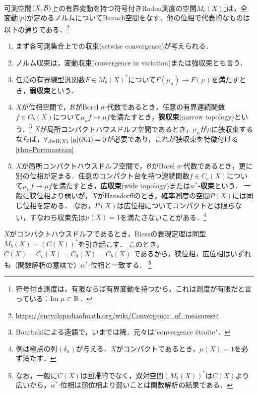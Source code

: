 \documentclass[uplatex,dvipdfmx]{jsreport}
\begin{document}
\begin{definition}
    可測空間$(X,\mathcal{B})$上の有界変動を持つ符号付きRadon測度の空間$M_b(X)$\footnote{符号付き測度は，有限ならば有界変動を持つから，これは測度が有限だと言っている：$\mathrm{Im}\;\mu\subset\mathbb{R}$．}は，全変動$\lvert\mu\rvert$が定めるノルムについてBanach空間をなす．他の位相で代表的なものは以下の通りである．\footnote{\url{https://encyclopediaofmath.org/wiki/Convergence_of_measures}}
    \begin{enumerate}
        \item まず各可測集合上での収束(setwise convergence)が考えられる．
        \item ノルム収束は，変動収束(convergence in variation)または強収束とも言う．
        \item 任意の有界線型汎関数$F\in M_b(X)^*$について$F(\mu_n)\to F(\mu)$を満たすとき，\textbf{弱収束}という．
        \item $X$が位相空間で，$\mathcal{B}$がBorel $\sigma$-代数であるとき，任意の有界連続関数$f\in C_b(X)$について$\mu_nf\to\mu f$を満たすとき，\textbf{狭収束}(narrow topology)という．\footnote{Bourbakiによる造語で，いまでは稀．元々は"convergence étroite"．}
        $X$が局所コンパクトハウスドルフ空間であるとき，$\mu_n$が$\mu$に狭収束するならば，$\forall_{A\in\mathcal{B}(X)}\;\lvert\mu\rvert(\partial A)=0$が必要であり，これが狭収束を特徴付ける\ref{thm-Portmanteau}
        \item $X$が局所コンパクトハウスドルフ空間で，$\mathcal{B}$がBorel $\sigma$-代数であるとき，更に別の位相が定まる．任意のコンパクト台を持つ連続関数$f\in C_c(X)$について$\mu_nf\to\mu f$を満たすとき，\textbf{広収束}(wide topology)または\textbf{$w^*$-収束}という．
        一般に狭位相より弱いが，$X$がHausdorffのとき，確率測度の空間$P(X)$には同じ位相を定める．
        なお，$P(X)$は広位相についてコンパクトとは限らない，すなわち収束先は$\mu(X)=1$を満たさないことがある．\footnote{例は極点の列$(\delta_n)$が与える．$X$がコンパクトであるとき，$\mu(X)=1$を必ず満たす．}
    \end{enumerate}
\end{definition}
\begin{remark}
\end{remark}

\begin{example}
    $X$がコンパクトハウスドルフであるとき，Rieszの表現定理は同型$M_b(X)=(C(X))^*$を引き起こす．
    このとき，$C(X)=C_c(X)=C_0(X)=C_b(X)$
    であるから，狭位相，広位相はいずれも（関数解析の意味で）$w^*$-位相と一致する．
    \footnote{なお，一般に$C(X)$は回帰的でなく，双対空間$(M_b(X))^*$は$C(X)$より広いから，$w^*$-位相は弱位相より弱いことは関数解析の結果である．}
\end{example}
\end{document}
